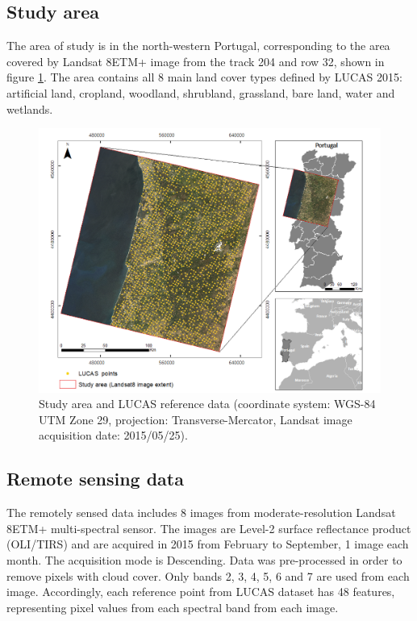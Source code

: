 \documentclass[remotesensing,article,submit,moreauthors,pdftex]{Definitions/mdpi}
\begin{document}
\subsection{Study area}

The area of study is in the north-western Portugal, corresponding to the area
covered by Landsat 8ETM+ image from the track 204 and row 32, shown in figure
\ref{fig:studyarea}. The area contains all 8 main land cover types defined by
LUCAS 2015: artificial land, cropland, woodland, shrubland, grassland, bare
land, water and wetlands.

\begin{figure}[H]
	\centering
	\includegraphics[width=1\linewidth]{../analysis/study_area}
	\caption{Study area and LUCAS reference data (coordinate system:
		WGS-84 UTM Zone 29, projection: Transverse-Mercator, Landsat image 
		acquisition date: 2015/05/25).}
	\label{fig:studyarea}
\end{figure}

\subsection{Remote sensing data}

The remotely sensed data includes 8 images from moderate-resolution Landsat
8ETM+ multi-spectral sensor. The images are Level-2 surface reflectance product 
(OLI/TIRS) and are acquired in 2015 from February to September, 1 image each 
month. The acquisition mode is Descending.  Data was pre-processed in order to 
remove pixels with cloud cover. Only bands 2, 3, 4, 5, 6 and 7 are used from 
each image. Accordingly, each reference point from LUCAS dataset has 48 
features, representing pixel values from each spectral band from each image.
\end{document}
